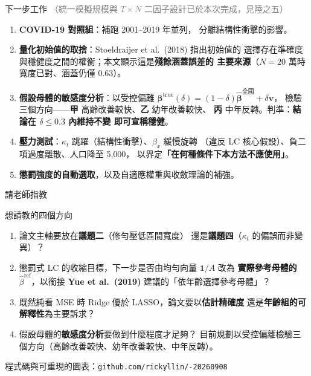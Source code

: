 \documentclass[aspectratio=169, UTF8, fontset=macnew, 11pt]{ctexbeamer}
\newcommand{\hi}[1]{\textcolor{red!70!black}{\textbf{#1}}}
\newcommand{\gd}[1]{\textcolor{green!45!black}{\textbf{#1}}}
\begin{document}
\begin{frame}{下一步工作}
\footnotesize
\textcolor{gray}{（統一模擬規模與 $T\times N$ 二因子設計已於本次完成，見陸之五）}
\vspace{4pt}
\begin{enumerate}\small\setlength{\itemsep}{7pt}
  \item \textbf{COVID-19 對照組}：補跑 2001--2019 年並列，
        分離結構性衝擊的影響。
  \item \textbf{量化初始值的取捨}：Stoeldraijer et al.\ (2018) 指出初始值的
        選擇存在準確度與穩健度之間的權衡；本文顯示這是\hi{殘餘涵蓋誤差的
        主要來源}（$N=20$ 萬時寬度已對、涵蓋仍僅 0.63）。
  \item \textbf{假設母體的敏感度分析}：以受控偏離
        $\boldsymbol{\beta}^{\text{true}}(\delta)=(1-\delta)
        \hat{\boldsymbol{\beta}}^{\text{全國}}+\delta\mathbf{v}$，
        檢驗三個方向——\textbf{甲} 高齡改善較快、\textbf{乙} 幼年改善較快、
        \textbf{丙} 中年反轉。判準：\gd{結論在 $\delta\le0.3$ 內維持不變
        即可宣稱穩健}。
  \item \textbf{壓力測試}：$\kappa_t$ 跳躍（結構性衝擊）、$\beta_x$ 緩慢旋轉
        （違反 LC 核心假設）、負二項過度離散、人口降至 5{,}000，
        以界定\hi{「在何種條件下本方法不應使用」}。
  \item \textbf{懲罰強度的自動選取}，以及自適應權重與收斂理論的補強。
\end{enumerate}
\end{frame}

\begin{frame}{請老師指教}
\vspace{4pt}
\begin{block}{想請教的四個方向}
\begin{enumerate}\setlength{\itemsep}{8pt}
  \item 論文主軸要放在\textbf{議題二}（修勻壓低區間寬度）
        還是\textbf{議題四}（$\kappa_t$ 的偏誤而非變異）？
  \item 懲罰式 LC 的收縮目標，下一步是否由均勻向量 $\mathbf{1}/A$ 改為
        \textbf{實際參考母體的 $\hat\beta^{\text{ref}}$}，以銜接
        \textbf{Yue et al.\ (2019)} 建議的「依年齡選擇參考母體」？
  \item 既然純看 MSE 時 Ridge 優於 LASSO，論文要以\textbf{估計精確度}
        還是\textbf{年齡組的可解釋性}為主要訴求？
  \item 假設母體的\textbf{敏感度分析}要做到什麼程度才足夠？
        目前規劃以受控偏離檢驗三個方向（高齡改善較快、幼年改善較快、中年反轉）。
\end{enumerate}
\end{block}
\vspace{6pt}
\begin{center}
\footnotesize 程式碼與可重現的圖表：\texttt{github.com/rickyllin/-20260908}
\end{center}
\end{frame}
\end{document}
